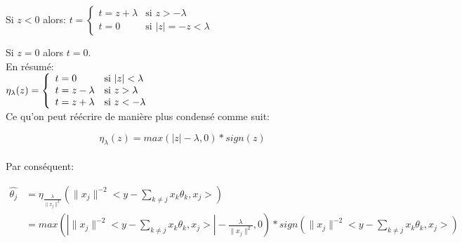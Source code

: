 \documentclass{article}
\begin{document}
Si $z < 0$ alors: 
$t = \left\{
    \begin{array}{lll}
        t = z + \lambda & \mbox{si } z > - \lambda \\
        t = 0 & \mbox{si } |z| = -z < \lambda 
    \end{array}
\right.$

Si $z = 0$ alors $t = 0$.\\

En résumé:\\
 
$\eta_\lambda(z) = \left\{
    \begin{array}{lll}
        t = 0 & \mbox{si } |z| < \lambda \\
        t = z - \lambda & \mbox{si } z > \lambda \\
        t = z + \lambda & \mbox{si } z < - \lambda 
    \end{array}
\right. \\ $ \\

Ce qu'on peut réécrire de manière plus condensé comme suit:

$$\eta_\lambda(z) = max(|z| - \lambda,0)*sign(z)$$ \\

Par conséquent:
 
\begin{align*}
\hat{\theta_j} &= \eta_\frac{\lambda}{\|x_j\|^2}( \|x_j\|^{-2}<y - \sum_{k \ne j} x_k\theta_k,x_j>) \\
&=  max(|\|x_j\|^{-2}<y - \sum_{k \ne j} x_k\theta_k,x_j>| -\frac{\lambda}{\|x_j\|^2},0)*sign(\|x_j\|^{-2}<y - \sum_{k \ne j} x_k\theta_k,x_j>)
\end{align*}
\end{document}

